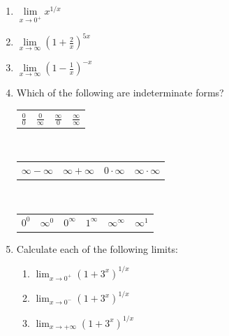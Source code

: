 \documentclass[12pt]{article}
\newif\ifans
\begin{document}
\begin{enumerate}
\ifans{\fbox{0}} \fi

\item $\lim\limits_{x\rightarrow 0^+} x^{1/x}$ 

\ifans{\fbox{0}} \fi

\item $\lim\limits_{x\rightarrow \infty} \left(1+\frac{2}{x}\right)^{5x}$ 

\ifans{\fbox{$e^{10}$}} \fi

\item $\lim\limits_{x\rightarrow \infty} \left(1-\frac{1}{x}\right)^{-x}$ 

\ifans{\fbox{$e$}} \fi

\newpage

\item Which of the following are indeterminate forms?

\begin{center}
\begin{tabular}{cccc}
$\frac{0}{0}$ & $\frac{0}{\infty}$ & $\frac{\infty}{0}$& $\frac{\infty}{\infty}$
\end{tabular}\\
\medskip
\begin{tabular}{cccc}
$\infty-\infty$ & $\infty+\infty$ & $0 \cdot \infty$ & $\infty \cdot \infty$
\end{tabular}\\
\medskip
\begin{tabular}{cccccc}
$0^0$ & $\infty^0$ & $0^{\infty}$ & $1^\infty$ & $\infty^{\infty}$ & $\infty^{1}$
\end{tabular}
\end{center}

\ifans{\fbox{$\frac{0}{0}$, $\frac{\infty}{\infty}$, $\infty-\infty$, $0 \cdot \infty$, ${0}^{0}$, ${\infty}^{0}$, $1^{\infty}$}} \fi

\item Calculate each of the following limits:

\begin{enumerate}

\item $\lim_{x \rightarrow 0^{+}}{(1+3^x)^{1/x}}$

\ifans{\fbox{$+\infty$}} \fi

\item $\lim_{x \rightarrow 0^{-}}{(1+3^x)^{1/x}}$

\ifans{\fbox{$0$}} \fi

\item $\lim_{x \rightarrow +\infty}{(1+3^x)^{1/x}}$


\end{enumerate}
\end{enumerate}
\end{document}
